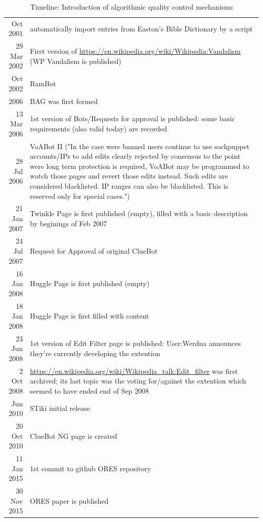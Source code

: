 \begin{table}
    \begin{tabular}{ r | p{}}
   Oct 2001 & automatically import entries from Easton’s Bible Dictionary by a script \\
29 Mar 2002 & First version of \url{https://en.wikipedia.org/wiki/Wikipedia:Vandalism} (WP Vandalism is published) \\
   Oct 2002 & RamBot \\
       2006 & BAG was first formed \\
13 Mar 2006 & 1st version of Bots/Requests for approval is published: some basic requirements (also valid today) are recorded \\
28 Jul 2006 & VoABot II ("In the case were banned users continue to use sockpuppet accounts/IPs to add edits clearly rejected by consensus to the point were long term protection is required, VoABot may be programmed to watch those pages and revert those edits instead. Such edits are considered blacklisted. IP ranges can also be blacklisted. This is reserved only for special cases.") \\
21 Jan 2007 & Twinkle Page is first published (empty), filled with a basic description by beginings of Feb 2007 \\
24 Jul 2007 & Request for Approval of original ClueBot \\
16 Jan 2008 & Huggle Page is first published (empty) \\
18 Jan 2008 & Huggle Page is first filled with content \\
23 Jun 2008 & 1st version of Edit Filter page is published: User:Werdna announces they're currently developing the extention \\
 2 Oct 2008 & \url{https://en.wikipedia.org/wiki/Wikipedia_talk:Edit_filter} was first archived; its last topic was the voting for/against the extention which seemed to have ended end of Sep 2008 \\
   Jun 2010 & STiki initial release \\
20 Oct 2010 & ClueBot NG page is created \\
11 Jan 2015 & 1st commit to github ORES repository \\
30 Nov 2015 & ORES paper is published
    \end{tabular}
    \caption{Timeline: Introduction of algorithmic quality control mechanisms}~\label{fig:timeline}
\end{table}

